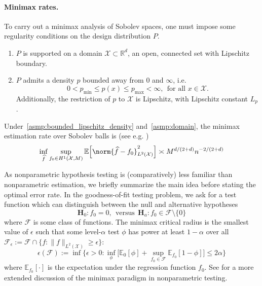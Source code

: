\documentclass[twoside]{article}
\newcommand{\Reals}{\mathbb{R}}
\newcommand{\1}{\mathbf{1}}
\newcommand{\Rd}{\Reals^d}
\newcommand{\Xset}{\mathcal{X}}
\newcommand{\Leb}{L}
\newcommand{\mc}[1]{\mathcal{#1}}
\newcommand{\Ebb}{\mathbb{E}}
\newcommand{\wh}[1]{\widehat{#1}}
\theoremstyle{definition}
\theoremstyle{remark}
\begin{document}
\paragraph{Minimax rates.}
To carry out a minimax analysis of Sobolev spaces, one must impose some regularity conditions on the design distribution $P$. 
\begin{enumerate}[label=(P\arabic*)]
	\item
	\label{asmp:domain}
	$P$ is supported on a domain $\Xset \subset \Rd$, an open, connected set with Lipschitz boundary.
	\item
	\label{asmp:bounded_lipschitz_density} 
	$P$ admits a density $p$ bounded away from $0$ and $\infty$, i.e.
	\begin{equation*}
	0 < p_{\min} \leq p(x) \leq p_{\max} < \infty,~~\textrm{for all $x \in \Xset$.}
	\end{equation*}
	Additionally, the restriction of $p$ to $\Xset$ is Lipschitz, with Lipschitz constant $L_p$.
\end{enumerate}

Under~\ref{asmp:bounded_lipschitz_density} and~\ref{asmp:domain}, the minimax estimation rate over Sobolev balls is (see e.g. \citep{tsybakov2008_book})
\begin{equation}
\label{eqn:sobolev_space_estimation_minimax_rate}
\inf_{\wh{f}} \sup_{f_0 \in H^1(\Xset, M)} \Ebb\Bigl[\norm{\wh{f} - f_0}_{L^2(\Xset)}^2\Bigr] \asymp M^{d/(2 + d)}n^{-2/(2 + d)}
\end{equation}

As nonparametric hypothesis testing is (comparatively) less familiar than nonparametric estimation, we briefly summarize the main idea before stating the optimal error rate. In the goodness-of-fit testing problem, we ask for a test function which can distinguish between the null and alternative hypotheses
\begin{equation}
\mathbf{H}_0: f_0 = 0, ~~\textrm{versus}~~ \mathbf{H}_a: f_0 \in \mc{F} \setminus \{0\}
\end{equation} 
where $\mc{F}$ is some class of functions. The minimax critical radius is the smallest value of $\epsilon$ such that some level-${\alpha}$ test $\phi$ has power at least $1 - \alpha$ over all $\mc{F}_{\epsilon} := \mc{F} \cap \{f: \|f\|_{\Leb^2(\Xset)} \geq \epsilon\}$:
\begin{equation*}
\epsilon(\mc{F}) := \inf\Biggl\{\epsilon > 0: \inf_{\phi} \biggl[\Ebb_0[\phi] +  \sup_{f_0 \in \mc{F}} \Ebb_{f_0}[1 - \phi]\biggr] \leq 2\alpha\Biggr\}
\end{equation*} 
where $\Ebb_{f_0}[\cdot]$ is the expectation under the regression function $f_0$. See \cite{ariascastro2018} for a more extended discussion of the minimax paradigm in nonparametric testing. 
\end{document}
